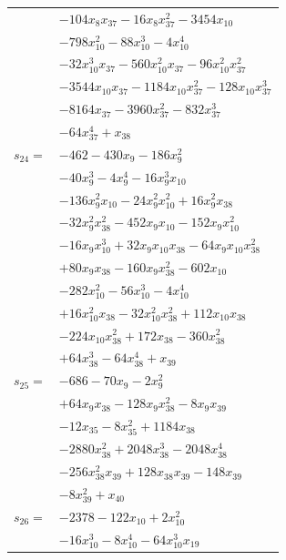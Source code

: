 \begin{longtable}{@{}r@{\;}l@{}}
 & \(\displaystyle -104x_{8}x_{37} -16x_{8}x_{37}^{2} -3454x_{10}\) \\
 & \(\displaystyle -798x_{10}^{2} -88x_{10}^{3} -4x_{10}^{4}\) \\
 & \(\displaystyle -32x_{10}^{3}x_{37} -560x_{10}^{2}x_{37} -96x_{10}^{2}x_{37}^{2}\) \\
 & \(\displaystyle -3544x_{10}x_{37} -1184x_{10}x_{37}^{2} -128x_{10}x_{37}^{3}\) \\
 & \(\displaystyle -8164x_{37} -3960x_{37}^{2} -832x_{37}^{3}\) \\
 & \(\displaystyle -64x_{37}^{4} +x_{38}\) \\[3pt]
\(s_{24}=\) & \(\displaystyle -462 -430x_{9} -186x_{9}^{2}\) \\
 & \(\displaystyle -40x_{9}^{3} -4x_{9}^{4} -16x_{9}^{3}x_{10}\) \\
 & \(\displaystyle -136x_{9}^{2}x_{10} -24x_{9}^{2}x_{10}^{2} +16x_{9}^{2}x_{38}\) \\
 & \(\displaystyle -32x_{9}^{2}x_{38}^{2} -452x_{9}x_{10} -152x_{9}x_{10}^{2}\) \\
 & \(\displaystyle -16x_{9}x_{10}^{3} +32x_{9}x_{10}x_{38} -64x_{9}x_{10}x_{38}^{2}\) \\
 & \(\displaystyle +80x_{9}x_{38} -160x_{9}x_{38}^{2} -602x_{10}\) \\
 & \(\displaystyle -282x_{10}^{2} -56x_{10}^{3} -4x_{10}^{4}\) \\
 & \(\displaystyle +16x_{10}^{2}x_{38} -32x_{10}^{2}x_{38}^{2} +112x_{10}x_{38}\) \\
 & \(\displaystyle -224x_{10}x_{38}^{2} +172x_{38} -360x_{38}^{2}\) \\
 & \(\displaystyle +64x_{38}^{3} -64x_{38}^{4} +x_{39}\) \\[3pt]
\(s_{25}=\) & \(\displaystyle -686 -70x_{9} -2x_{9}^{2}\) \\
 & \(\displaystyle +64x_{9}x_{38} -128x_{9}x_{38}^{2} -8x_{9}x_{39}\) \\
 & \(\displaystyle -12x_{35} -8x_{35}^{2} +1184x_{38}\) \\
 & \(\displaystyle -2880x_{38}^{2} +2048x_{38}^{3} -2048x_{38}^{4}\) \\
 & \(\displaystyle -256x_{38}^{2}x_{39} +128x_{38}x_{39} -148x_{39}\) \\
 & \(\displaystyle -8x_{39}^{2} +x_{40}\) \\[3pt]
\(s_{26}=\) & \(\displaystyle -2378 -122x_{10} +2x_{10}^{2}\) \\
 & \(\displaystyle -16x_{10}^{3} -8x_{10}^{4} -64x_{10}^{3}x_{19}\) \\

\end{longtable}
